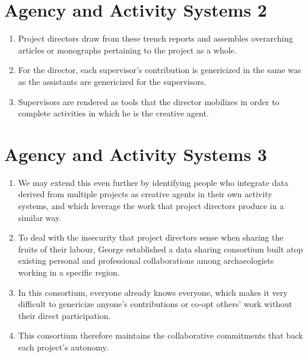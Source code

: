 \documentclass[12pt]{article}
\begin{document}
\section{Agency and Activity Systems 2}
\begin{enumerate}
  \item Project directors draw from these trench reports and assembles overarching articles or monographs pertaining to the project as a whole.
  \item For the director, each supervisor's contribution is genericized in the same was as the assistants are genericized for the supervisors.
  \item Supervisors are rendered as tools that the director mobilizes in order to complete activities in which he is the creative agent.
\end{enumerate}

\section{Agency and Activity Systems 3}
\begin{enumerate}
  \item We may extend this even further by identifying people who integrate data derived from multiple projects as creative agents in their own activity systems, and which leverage the work that project directors produce in a similar way.
  \item To deal with the insecurity that project directors sense when sharing the fruits of their labour, George established a data sharing consortium built atop existing personal and professional collaborations among archaeologists working in a specific region.
  \item In this consortium, everyone already knows everyone, which makes it very difficult to genericize anyone's contributions or co-opt others' work without their direct participation.
  \item This consortium therefore maintains the collaborative commitments that back each project's autonomy.
\end{enumerate}
\end{document}
